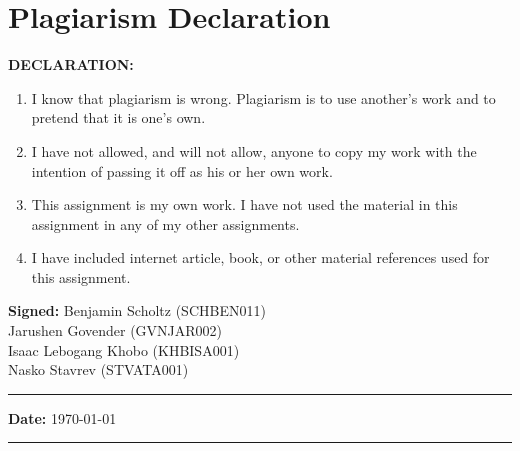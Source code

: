 
\newpage
\section{Plagiarism Declaration}
\textbf{DECLARATION:}
\begin{enumerate}
\item I know that plagiarism is wrong. Plagiarism is to use another’s work and to pretend that it is one’s own.
\item I have not allowed, and will not allow, anyone to copy my work with the intention of passing it off as his or her own work.
\item This assignment is my own work. I have not used the material in this assignment in any of my other assignments.
\item I have included internet article, book, or other material references used for this assignment.
\end{enumerate}

\textbf{Signed:} Benjamin Scholtz (SCHBEN011)\\
Jarushen Govender (GVNJAR002)\\
Isaac Lebogang Khobo (KHBISA001)\\
Nasko Stavrev (STVATA001)\\
\hrule
\textbf{Date:} \today \\
\hrule